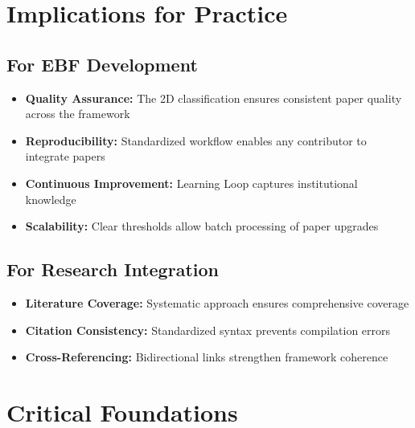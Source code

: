 
\section{Implications for Practice}
\label{sec:paperint-implications}

\subsection{For EBF Development}

\begin{itemize}
    \item \textbf{Quality Assurance:} The 2D classification ensures consistent paper quality across the framework
    \item \textbf{Reproducibility:} Standardized workflow enables any contributor to integrate papers
    \item \textbf{Continuous Improvement:} Learning Loop captures institutional knowledge
    \item \textbf{Scalability:} Clear thresholds allow batch processing of paper upgrades
\end{itemize}

\subsection{For Research Integration}

\begin{itemize}
    \item \textbf{Literature Coverage:} Systematic approach ensures comprehensive coverage
    \item \textbf{Citation Consistency:} Standardized syntax prevents compilation errors
    \item \textbf{Cross-Referencing:} Bidirectional links strengthen framework coherence
\end{itemize}


\section{Critical Foundations}
\label{sec:paperint-foundations}

